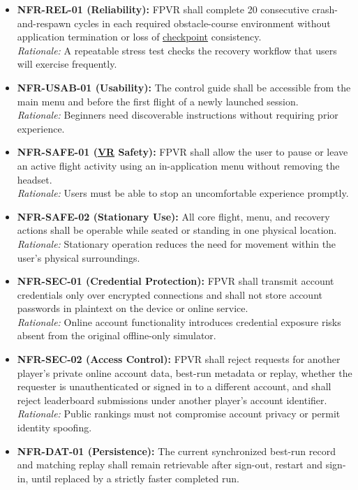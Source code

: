 \documentclass[12pt]{article}
\begin{document}
\begin{itemize}
\item \hypertarget{req:NFR-REL-01}{}\textbf{NFR-REL-01 (Reliability):} FPVR shall complete 20 consecutive crash-and-respawn cycles in each required obstacle-course environment without application termination or loss of \hyperlink{glos:Checkpoint}{checkpoint} consistency.\\
\textit{Rationale:} A repeatable stress test checks the recovery workflow that users will exercise frequently.
\item \hypertarget{req:NFR-USAB-01}{}\textbf{NFR-USAB-01 (Usability):} The control guide shall be accessible from the main menu and before the first flight of a newly launched session.\\
\textit{Rationale:} Beginners need discoverable instructions without requiring prior experience.
\item \hypertarget{req:NFR-SAFE-01}{}\textbf{NFR-SAFE-01 (\hyperlink{glos:VR}{VR} Safety):} FPVR shall allow the user to pause or leave an active flight activity using an in-application menu without removing the headset.\\
\textit{Rationale:} Users must be able to stop an uncomfortable experience promptly.
\item \hypertarget{req:NFR-SAFE-02}{}\textbf{NFR-SAFE-02 (Stationary Use):} All core flight, menu, and recovery actions shall be operable while seated or standing in one physical location.\\
\textit{Rationale:} Stationary operation reduces the need for movement within the user's physical surroundings.
\item \hypertarget{req:NFR-SEC-01}{}\textbf{NFR-SEC-01 (Credential Protection):} FPVR shall transmit account credentials only over encrypted connections and shall not store account passwords in plaintext on the device or online service.\\
\textit{Rationale:} Online account functionality introduces credential exposure risks absent from the original offline-only simulator.
\item \hypertarget{req:NFR-SEC-02}{}\textbf{NFR-SEC-02 (Access Control):} FPVR shall reject requests for another player's private online account data, best-run metadata or replay, whether the requester is unauthenticated or signed in to a different account, and shall reject leaderboard submissions under another player's account identifier.\\
\textit{Rationale:} Public rankings must not compromise account privacy or permit identity spoofing.
\item \hypertarget{req:NFR-DAT-01}{}\textbf{NFR-DAT-01 (Persistence):} The current synchronized best-run record and matching replay shall remain retrievable after sign-out, restart and sign-in, until replaced by a strictly faster completed run.\\

\end{itemize}
\end{document}
